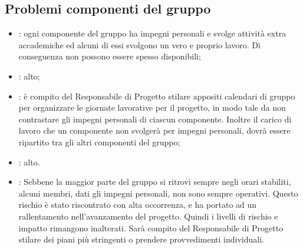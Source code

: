 \subsection{Problemi componenti del gruppo}
\begin{itemize}
\item {}: ogni componente del gruppo ha impegni personali e svolge attività extra accademiche ed alcuni di essi svolgono un vero e proprio lavoro. Di conseguenza non possono essere spesso disponibili;
\item {}: alto;
\item {}: è compito del Responsabile di Progetto stilare appositi calendari di gruppo per organizzare le giornate lavorative per il progetto, in modo tale da non contrastare gli impegni personali di ciascun componente. Inoltre il carico di lavoro che un componente non svolgerà per impegni personali, dovrà essere ripartito tra gli altri componenti del gruppo;
\item {}: alto.
\item {}: Sebbene la maggior parte del gruppo si ritrovi sempre negli orari stabiliti, alcuni membri, dati gli impegni personali, non sono sempre operativi. Questo rischio è stato riscontrato con alta occorrenza, e ha portato ad un rallentamento nell'avanzamento del progetto. Quindi i livelli di rischio e impatto rimangono inalterati. Sarà compito del Responsabile di Progetto stilare dei piani più stringenti o prendere provvedimenti individuali.
\end{itemize}

